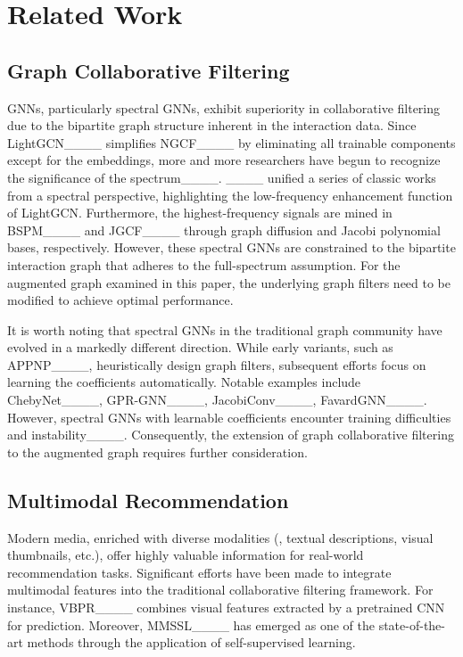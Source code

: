 \section{Related Work}
\subsection{Graph Collaborative Filtering}

GNNs, particularly spectral GNNs, 
exhibit superiority in collaborative filtering due to the bipartite graph structure inherent in the interaction data.
Since LightGCN____ simplifies NGCF____ by eliminating all trainable components except for the embeddings, 
more and more researchers have begun to recognize the significance of the spectrum____.
____ unified a series of classic works from a spectral perspective, 
highlighting the low-frequency enhancement function of LightGCN.
Furthermore, the highest-frequency signals are mined in BSPM____ and JGCF____ through graph diffusion and Jacobi polynomial bases, respectively.
However, these spectral GNNs are constrained to the bipartite interaction graph that adheres to the full-spectrum assumption. 
For the augmented graph examined in this paper, the underlying graph filters need to be modified to achieve optimal performance.

It is worth noting that spectral GNNs in the traditional graph community have evolved in a markedly different direction.
While early variants, 
such as APPNP____, 
heuristically design graph filters, 
subsequent efforts focus on learning the coefficients automatically. 
Notable examples include ChebyNet____, GPR-GNN____, JacobiConv____, FavardGNN____.
However, spectral GNNs with learnable coefficients encounter training difficulties and instability____.
Consequently, the extension of graph collaborative filtering to the augmented graph requires further consideration.


\subsection{Multimodal Recommendation}
Modern media, enriched with diverse modalities (\eg, textual descriptions, visual thumbnails, etc.), 
offer highly valuable information for real-world recommendation tasks.
Significant efforts have been made to integrate multimodal features into the traditional collaborative filtering framework. 
For instance, VBPR____ combines visual features extracted by a pretrained CNN for prediction. 
Moreover, MMSSL____ has emerged as one of the state-of-the-art methods through the application of self-supervised learning.

